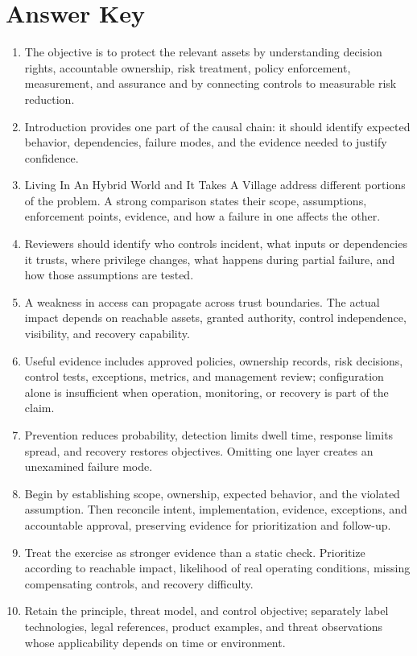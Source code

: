\documentclass[11pt]{article}
\begin{document}
\section*{Answer Key}
\begin{enumerate}
\item The objective is to protect the relevant assets by understanding decision rights, accountable ownership, risk treatment, policy enforcement, measurement, and assurance and by connecting controls to measurable risk reduction.
\item Introduction provides one part of the causal chain: it should identify expected behavior, dependencies, failure modes, and the evidence needed to justify confidence.
\item Living In An Hybrid World and It Takes A Village address different portions of the problem. A strong comparison states their scope, assumptions, enforcement points, evidence, and how a failure in one affects the other.
\item Reviewers should identify who controls incident, what inputs or dependencies it trusts, where privilege changes, what happens during partial failure, and how those assumptions are tested.
\item A weakness in access can propagate across trust boundaries. The actual impact depends on reachable assets, granted authority, control independence, visibility, and recovery capability.
\item Useful evidence includes approved policies, ownership records, risk decisions, control tests, exceptions, metrics, and management review; configuration alone is insufficient when operation, monitoring, or recovery is part of the claim.
\item Prevention reduces probability, detection limits dwell time, response limits spread, and recovery restores objectives. Omitting one layer creates an unexamined failure mode.
\item Begin by establishing scope, ownership, expected behavior, and the violated assumption. Then reconcile intent, implementation, evidence, exceptions, and accountable approval, preserving evidence for prioritization and follow-up.
\item Treat the exercise as stronger evidence than a static check. Prioritize according to reachable impact, likelihood of real operating conditions, missing compensating controls, and recovery difficulty.
\item Retain the principle, threat model, and control objective; separately label technologies, legal references, product examples, and threat observations whose applicability depends on time or environment.
\end{enumerate}
\end{document}
